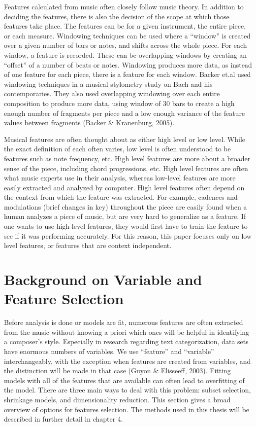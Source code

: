 \documentclass[12pt,twoside]{reedthesis}
\theoremstyle{definition}
\theoremstyle{definition}
\theoremstyle{definition}
\theoremstyle{remark}
\begin{document}
Features calculated from music often closely follow music theory. In
addition to deciding the features, there is also the decision of the
scope at which those features take place. The features can be for a
given instrument, the entire piece, or each measure. Windowing
techniques can be used where a ``window'' is created over a given number
of bars or notes, and shifts across the whole piece. For each window, a
feature is recorded. These can be overlapping windows by creating an
``offset'' of a number of beats or notes. Windowing produces more data,
as instead of one feature for each piece, there is a feature for each
window. Backer et.al used windowing techniques in a musical stylometry
study on Bach and his contemporaries. They also used overlapping
windowing over each entire composition to produce more data, using
window of 30 bars to create a high enough number of fragments per piece
and a low enough variance of the feature values between fragments
(Backer \& Kranenburg, 2005).

Musical features are often thought about as either high level or low
level. While the exact definition of each often varies, low level is
often understood to be features such as note frequency, etc. High level
features are more about a broader sense of the piece, including chord
progressions, etc. High level features are often what music experts use
in their analysis, whereas low-level features are more easily extracted
and analyzed by computer. High level features often depend on the
context from which the feature was extracted. For example, cadences and
modulations (brief changes in key) throughout the piece are easily found
when a human analyzes a piece of music, but are very hard to generalize
as a feature. If one wants to use high-level features, they would first
have to train the feature to see if it was performing accurately. For
this reason, this paper focuses only on low level features, or features
that are context independent.

\section{Background on Variable and Feature
Selection}\label{background-on-variable-and-feature-selection}

Before analysis is done or models are fit, numerous features are often
extracted from the music without knowing a priori which ones will be
helpful in identifying a composer's style. Especially in research
regarding text categorization, data sets have enormous numbers of
variables. We use ``feature'' and ``variable'' interchangeably, with the
exception when features are created from variables, and the distinction
will be made in that case (Guyon \& Elisseeff, 2003). Fitting models
with all of the features that are available can often lead to
overfitting of the model. There are three main ways to deal with this
problem: subset selection, shrinkage models, and dimensionality
reduction. This section gives a broad overview of options for features
selection. The methods used in this thesis will be described in further
detail in chapter 4.
\end{document}
